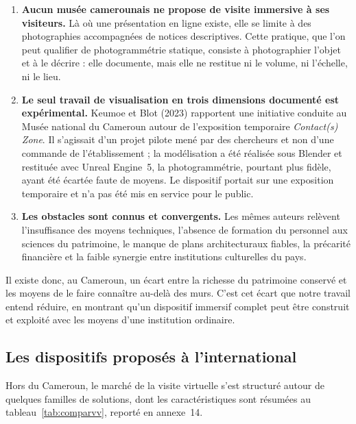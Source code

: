 \begin{enumerate}
  \item \textbf{Aucun musée camerounais ne propose de visite immersive à ses
        visiteurs.} Là où une présentation en ligne existe, elle se limite à
        des photographies accompagnées de notices descriptives. Cette pratique,
        que l'on peut qualifier de photogrammétrie statique, consiste à
        photographier l'objet et à le décrire : elle documente, mais elle ne
        restitue ni le volume, ni l'échelle, ni le lieu.

  \item \textbf{Le seul travail de visualisation en trois dimensions documenté
        est expérimental.} Keumoe et Blot (2023) rapportent une initiative
        conduite au Musée national du Cameroun autour de l'exposition
        temporaire \emph{Contact(s) Zone}. Il s'agissait d'un projet pilote mené
        par des chercheurs et non d'une commande de l'établissement ; la
        modélisation a été réalisée sous Blender et restituée avec Unreal
        Engine~5, la photogrammétrie, pourtant plus fidèle, ayant été écartée
        faute de moyens. Le dispositif portait sur une exposition temporaire et
        n'a pas été mis en service pour le public.

  \item \textbf{Les obstacles sont connus et convergents.} Les mêmes auteurs
        relèvent l'insuffisance des moyens techniques, l'absence de formation du
        personnel aux sciences du patrimoine, le manque de plans architecturaux
        fiables, la précarité financière et la faible synergie entre
        institutions culturelles du pays.
\end{enumerate}

Il existe donc, au Cameroun, un écart entre la richesse du patrimoine conservé
et les moyens de le faire connaître au-delà des murs. C'est cet écart que notre
travail entend réduire, en montrant qu'un dispositif immersif complet peut être
construit et exploité avec les moyens d'une institution ordinaire.

\subsection{Les dispositifs proposés à l'international}

Hors du Cameroun, le marché de la visite virtuelle s'est structuré autour de
quelques familles de solutions, dont les caractéristiques sont résumées au
tableau~\ref{tab:comparvv}, reporté en annexe~14.


